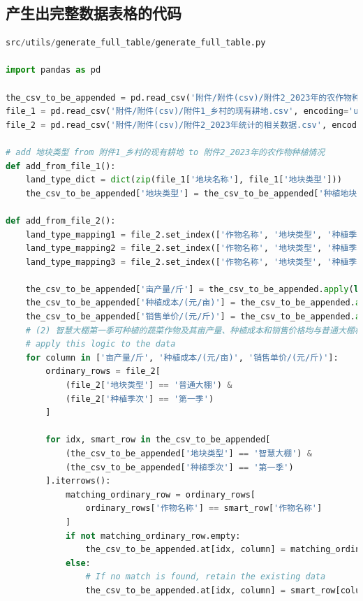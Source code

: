 \documentclass{cumcmthesis}
\begin{document}
\begin{appendices}
\subsection{产生出完整数据表格的代码}
\begin{lstlisting}[language=python]
src/utils/generate_full_table/generate_full_table.py

import pandas as pd

the_csv_to_be_appended = pd.read_csv('附件/附件(csv)/附件2_2023年的农作物种植情况.csv', encoding='utf-8-sig')
file_1 = pd.read_csv('附件/附件(csv)/附件1_乡村的现有耕地.csv', encoding='utf-8-sig')
file_2 = pd.read_csv('附件/附件(csv)/附件2_2023年统计的相关数据.csv', encoding='utf-8-sig')

# add 地块类型 from 附件1_乡村的现有耕地 to 附件2_2023年的农作物种植情况
def add_from_file_1():
    land_type_dict = dict(zip(file_1['地块名称'], file_1['地块类型']))
    the_csv_to_be_appended['地块类型'] = the_csv_to_be_appended['种植地块'].map(land_type_dict)

def add_from_file_2():
    land_type_mapping1 = file_2.set_index(['作物名称', '地块类型', '种植季次']).to_dict()['亩产量/斤']
    land_type_mapping2 = file_2.set_index(['作物名称', '地块类型', '种植季次']).to_dict()['种植成本/(元/亩)']
    land_type_mapping3 = file_2.set_index(['作物名称', '地块类型', '种植季次']).to_dict()['销售单价/(元/斤)']

    the_csv_to_be_appended['亩产量/斤'] = the_csv_to_be_appended.apply(lambda row: land_type_mapping1.get((row['作物名称'], row['地块类型'], row['种植季次'])), axis=1)
    the_csv_to_be_appended['种植成本/(元/亩)'] = the_csv_to_be_appended.apply(lambda row: land_type_mapping2.get((row['作物名称'], row['地块类型'], row['种植季次'])), axis=1)
    the_csv_to_be_appended['销售单价/(元/斤)'] = the_csv_to_be_appended.apply(lambda row: land_type_mapping3.get((row['作物名称'], row['地块类型'], row['种植季次'])), axis=1)
    # (2) 智慧大棚第一季可种植的蔬菜作物及其亩产量、种植成本和销售价格均与普通大棚相同，表中省略。
    # apply this logic to the data
    for column in ['亩产量/斤', '种植成本/(元/亩)', '销售单价/(元/斤)']:
        ordinary_rows = file_2[
            (file_2['地块类型'] == '普通大棚') & 
            (file_2['种植季次'] == '第一季')
        ]

        for idx, smart_row in the_csv_to_be_appended[
            (the_csv_to_be_appended['地块类型'] == '智慧大棚') & 
            (the_csv_to_be_appended['种植季次'] == '第一季')
        ].iterrows():
            matching_ordinary_row = ordinary_rows[
                ordinary_rows['作物名称'] == smart_row['作物名称']
            ]
            if not matching_ordinary_row.empty:
                the_csv_to_be_appended.at[idx, column] = matching_ordinary_row.iloc[0][column]
            else:
                # If no match is found, retain the existing data
                the_csv_to_be_appended.at[idx, column] = smart_row[column]



\end{lstlisting}
\end{appendices}
\end{document}
